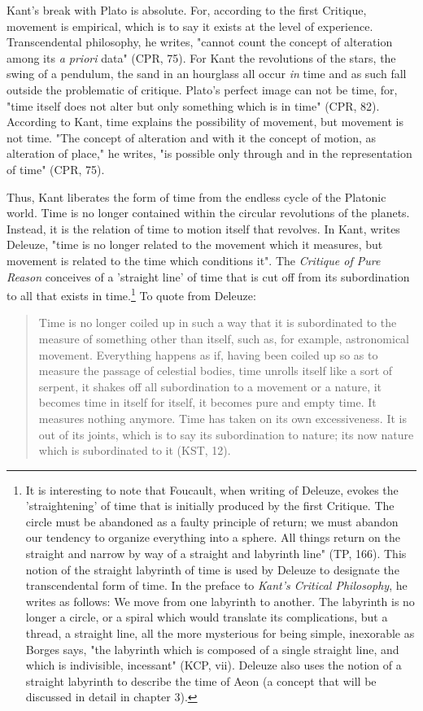 Kant's break with Plato is absolute. For, according to the first Critique, movement is empirical, which is to say it exists at the level of experience. Transcendental philosophy, he writes, "cannot count the concept of alteration among its \textit{a priori} data" (CPR, 75). For Kant the revolutions of the stars, the swing of a pendulum, the sand in an hourglass all occur \textit{in} time and as such fall outside the problematic of critique. Plato's perfect image can not be time, for, "time itself does not alter but only something which is in time" (CPR, 82). According to Kant, time explains the possibility of movement, but movement is not time. "The concept of alteration and with it the concept of motion, as alteration of place," he writes, "is possible only through and in the representation of time" (CPR, 75).

Thus, Kant liberates the form of time from the endless cycle of the Platonic world. Time is no longer contained within the circular revolutions of the planets. Instead, it is the relation of time to motion itself that revolves. In Kant, writes Deleuze, "time is no longer related to the movement which it measures, but movement is related to the time which conditions it". The \textit{Critique of Pure Reason} conceives of a 'straight line' of time that is cut off from its subordination to all that exists in time.\footnote{It is interesting to note that Foucault, when writing of Deleuze, evokes the 'straightening' of time that is initially produced by the first Critique. The circle must be abandoned as a faulty principle of return; we must abandon our tendency to organize everything into a sphere. All things return on the straight and narrow by way of a straight and labyrinth line" (TP, 166). This notion of the straight labyrinth of time is used by Deleuze to designate the transcendental form of time. In the preface to \textit{Kant's Critical Philosophy}, he writes as follows: We move from one labyrinth to another. The labyrinth is no longer a circle, or a spiral which would translate its complications, but a thread, a straight line, all the more mysterious for being simple, inexorable as Borges says, "the labyrinth which is composed of a single straight line, and which is indivisible, incessant" (KCP, vii). Deleuze also uses the notion of a straight labyrinth to describe the time of Aeon (a concept that will be discussed in detail in chapter 3).} To quote from Deleuze:

\begin{quote}
    Time is no longer coiled up in such a way that it is subordinated to the measure of something other than itself, such as, for example, astronomical movement. Everything happens as if, having been coiled up so as to measure the passage of celestial bodies, time unrolls itself like a sort of serpent, it shakes off all subordination to a movement or a nature, it becomes time in itself for itself, it becomes pure and empty time. It measures nothing anymore. Time has taken on its own excessiveness. It is out of its joints, which is to say its subordination to nature; its now nature which is subordinated to it (KST, 12).
\end{quote}

